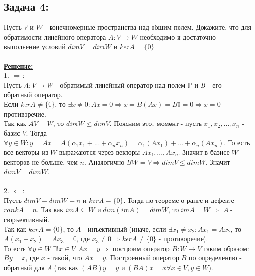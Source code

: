 \documentclass[a4paper,12pt,titlepage,final]{article}
\begin{document}
\subsection*{Задача 4:}
\noindent Пусть $V$ и $W$ - конечномерные пространства над общим полем. Докажите, что для обратимости линейного оператора $A: V \rightarrow W$
необходимо и достаточно выполнение условий $dim V = dim W$ и $ker A = \{0\}$ \\ \\
\textbf{\underline{Решение:}} \\
1. $\Rightarrow:$ \\
Пусть $A: V \rightarrow W$ - обратимый линейный оператор над полем $\mathbb{P}$ и $B$ - его обратный оператор. \\
Если $kerA \neq \{0\}$, то $\exists x \neq 0: Ax = 0 \Rightarrow x = B(Ax) = B0 = 0 \Rightarrow x = 0$ - противоречие. \\
Так как $AV = W$, то $dimW \leq dimV$. Поясним этот момент - пусть $x_1, x_2, ..., x_n$ - базис $V$.
Тогда $\forall y \in W: y = Ax = A(\alpha_1 x_1 + ... + \alpha_n x_n) = \alpha_1 (Ax_1) + ... + \alpha_n  (Ax_n)$.
То есть все векторы из $W$ выражаются через векторы $Ax_1, ... , Ax_n$. Значит в базисе $W$ векторов не больше, чем $n$.
Аналогично $BW = V \Rightarrow dimV \leq dimW$. Значит $dimV = dimW$. \\ \\
2. $\Leftarrow$: \\
Пусть $dimV = dimW = n$ и $kerA = \{0\}$. Тогда по теореме о ранге и дефекте - $rankA = n$.
Так как $imA \subseteq W$ и $dim(imA) = dimW$, то $imA = W \Rightarrow$ $A$ - сюръективный. \\
Так как $kerA = \{0\}$, то $A$ - инъективный (иначе, если $\exists x_1 \neq x_2: Ax_1 = Ax_2$, то $A(x_1 - x_2) = Ax_3 = 0$, где $x_3 \neq 0 \Rightarrow
kerA \neq \{0\}$ - противоречие). \\
То есть $\forall y \in W$ $\exists ! x \in V: Ax = y \Rightarrow$ построим оператор $B: W \rightarrow V$ таким образом: $By = x$, где $x$ - такой, что $Ax = y$.
Построенный оператор $B$ по определению - обратный для $A$ (так как $(AB)y = y$ и $(BA)x = x \forall x \in V, y \in W$). \\ \\ \\


\end{document}
